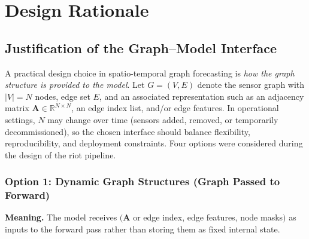 
\chapter{Design Rationale}
\label{ch:appendix-design-rationale}

\section{Justification of the Graph--Model Interface}
\label{sec:appendix-graph-interface}

A practical design choice in spatio-temporal graph forecasting is \emph{how the graph structure is provided to the model}. Let $G=(V,E)$ denote the sensor graph with $|V|=N$ nodes, edge set $E$, and an associated representation such as an adjacency matrix $\mathbf{A}\in\mathbb{R}^{N\times N}$, an edge index list, and/or edge features. In operational settings, $N$ may change over time (sensors added, removed, or temporarily decommissioned), so the chosen interface should balance flexibility, reproducibility, and deployment constraints. Four options were considered during the design of the \gls{riot} pipeline.

\subsection{Option 1: Dynamic Graph Structures (Graph Passed to Forward)}
\label{subsec:appendix-option1-dynamic}

\textbf{Meaning.} The model receives $(\mathbf{A}$ or edge index, edge features, node masks$)$ as inputs to the forward pass rather than storing them as fixed internal state.


